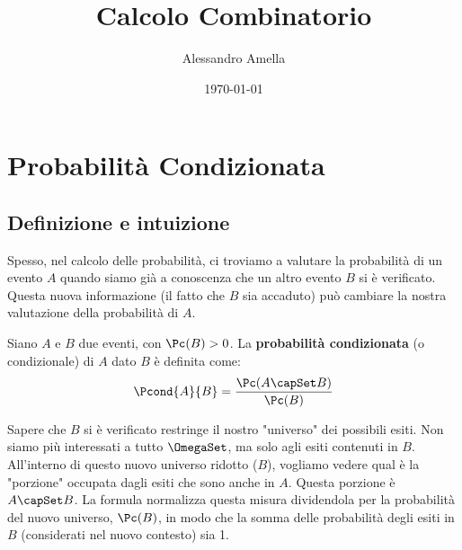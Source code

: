

\title{Calcolo Combinatorio}
\author{Alessandro Amella}
\date{\today}



\maketitle
\tableofcontents
\newpage

\section{Probabilità Condizionata}

\subsection{Definizione e intuizione}

Spesso, nel calcolo delle probabilità, ci troviamo a valutare la probabilità di un evento $A$ quando siamo già a conoscenza che un altro evento $B$ si è verificato. Questa nuova informazione (il fatto che $B$ sia accaduto) può cambiare la nostra valutazione della probabilità di $A$.

\begin{definition}
Siano $A$ e $B$ due eventi, con $\Pc(B) > 0$. La \textbf{probabilità condizionata} (o condizionale) di $A$ dato $B$ è definita come:
\[ \Pcond{A}{B} = \frac{\Pc(A \capSet B)}{\Pc(B)} \]
\end{definition}

\begin{remark}
Sapere che $B$ si è verificato restringe il nostro "universo" dei possibili esiti. Non siamo più interessati a tutto $\OmegaSet$, ma solo agli esiti contenuti in $B$. All'interno di questo nuovo universo ridotto ($B$), vogliamo vedere qual è la "porzione" occupata dagli esiti che sono anche in $A$. Questa porzione è $A \capSet B$. La formula normalizza questa misura dividendola per la probabilità del nuovo universo, $\Pc(B)$, in modo che la somma delle probabilità degli esiti in $B$ (considerati nel nuovo contesto) sia 1.
\end{remark}

